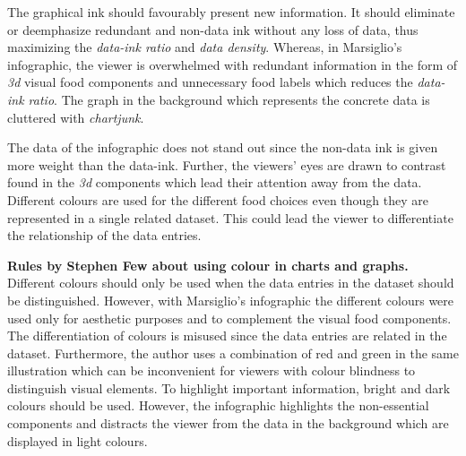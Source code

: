 The graphical ink should favourably present new information. It should eliminate
or deemphasize redundant and non-data ink without any loss of data, thus
maximizing the \textit{data-ink ratio} and \textit{data density}. Whereas, in
Marsiglio's infographic, the viewer is overwhelmed with redundant information in
the form of \textit{3d} visual food components and unnecessary food labels which
reduces the \textit{data-ink ratio}. The graph in the background which
represents the concrete data is cluttered with \textit{chartjunk}.

The data of the infographic does not stand out since the non-data ink is given
more weight than the data-ink. Further, the viewers' eyes are drawn to contrast
found in the \textit{3d} components which lead their attention away from the
data. Different colours are used for the different food choices even though they
are represented in a single related dataset. This could lead the viewer to
differentiate the relationship of the data entries.

\textbf{Rules by Stephen Few about using colour in charts and
graphs.}~\cite{Stephen2004} Different colours should only be used when the data
entries in the dataset should be distinguished. However, with Marsiglio's
infographic the different colours were used only for aesthetic purposes and to
complement the visual food components. The differentiation of colours is misused
since the data entries are related in the dataset. Furthermore, the author uses
a combination of red and green in the same illustration which can be
inconvenient for viewers with colour blindness to distinguish visual elements.
To highlight important information, bright and dark colours should be used.
However, the infographic highlights the non-essential components and distracts
the viewer from the data in the background which are displayed in light colours.
